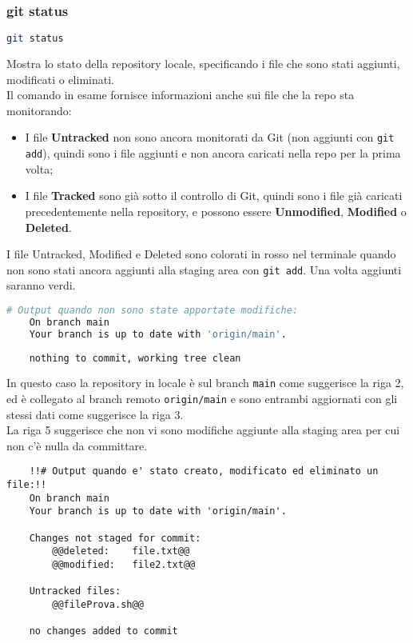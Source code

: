 \subsubsection{git status}
\begin{lstlisting}[language=bash]
	git status
\end{lstlisting}
Mostra lo stato della repository locale, specificando i file che sono stati aggiunti, modificati o eliminati.\\
Il comando in esame fornisce informazioni anche sui file che la repo sta monitorando:
\begin{itemize}[noitemsep, topsep=3pt]
	\item I file \textbf{Untracked} non sono ancora monitorati da Git (non aggiunti con \texttt{git add}), quindi sono i file aggiunti e non ancora caricati nella repo per la prima volta;
	\item I file \textbf{Tracked} sono già sotto il controllo di Git, quindi sono i file già caricati precedentemente nella repository, e possono essere \textbf{Unmodified}, \textbf{Modified} o \textbf{Deleted}.
\end{itemize}
I file Untracked, Modified e Deleted sono colorati in rosso nel terminale quando non sono stati ancora aggiunti alla staging area con \texttt{git add}. Una volta aggiunti saranno verdi.\\
\begin{lstlisting}[language=bash]
	# Output quando non sono state apportate modifiche:
	On branch main
	Your branch is up to date with 'origin/main'.
	
	nothing to commit, working tree clean
\end{lstlisting}
In questo caso la repository in locale è sul branch \texttt{main} come suggerisce la riga 2, ed è collegato al branch remoto \texttt{origin/main} e sono entrambi aggiornati con gli stessi dati come suggerisce la riga 3.\\
La riga 5 suggerisce che non vi sono modifiche aggiunte alla staging area per cui non c'è nulla da committare.
\begin{lstlisting}
	!!# Output quando e' stato creato, modificato ed eliminato un file:!!
	On branch main
	Your branch is up to date with 'origin/main'.
	
	Changes not staged for commit:
		@@deleted:    file.txt@@
		@@modified:   file2.txt@@
	
	Untracked files:  
		@@fileProva.sh@@
	
	no changes added to commit
\end{lstlisting}

